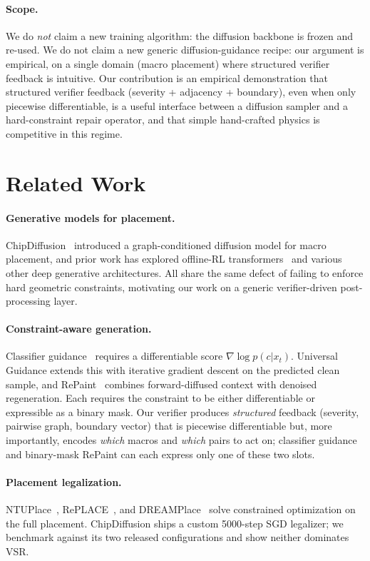 \documentclass{article}
\begin{document}
\paragraph{Scope.}  We do \emph{not} claim a new training algorithm: the
diffusion backbone is frozen and re-used.  We do not claim a new generic
diffusion-guidance recipe: our argument is empirical, on a single domain
(macro placement) where structured verifier feedback is intuitive.  Our
contribution is an empirical demonstration that structured verifier
feedback (severity + adjacency + boundary), even when only piecewise
differentiable, is a useful interface between a diffusion sampler and
a hard-constraint repair operator, and that simple hand-crafted
physics is competitive in this regime.

\section{Related Work}

\paragraph{Generative models for placement.}  ChipDiffusion~\cite{chipdiffusion}
introduced a graph-conditioned diffusion model for macro placement, and prior
work has explored offline-RL transformers~\cite{chipformer} and various other
deep generative architectures.  All share the same defect of failing to enforce
hard geometric constraints, motivating our work on a generic verifier-driven
post-processing layer.

\paragraph{Constraint-aware generation.}  Classifier
guidance~\cite{classifier-guidance} requires a differentiable score
$\nabla \log p(c|x_t)$.  Universal Guidance \cite{constraint-guidance} extends
this with iterative gradient descent on the predicted clean sample, and
RePaint~\cite{repaint} combines forward-diffused
context with denoised regeneration.  Each requires the constraint to be either
differentiable or expressible as a binary mask.  Our verifier produces \emph{structured} feedback
(severity, pairwise graph, boundary vector) that is piecewise
differentiable but, more importantly, encodes \emph{which} macros and
\emph{which} pairs to act on; classifier guidance and binary-mask
RePaint can each express only one of these two slots.

\paragraph{Placement legalization.}  NTUPlace~\cite{ntuplace},
RePLACE~\cite{replace}, and DREAMPlace~\cite{dreamplace} solve constrained
optimization on the full placement.  ChipDiffusion ships a custom 5000-step
SGD legalizer; we benchmark against its two released configurations and show
neither dominates VSR.
\end{document}
